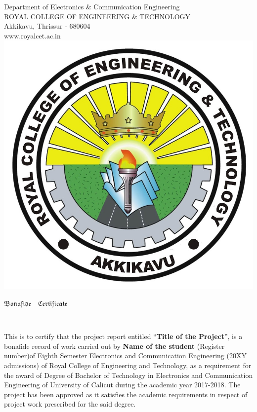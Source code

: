  \thispagestyle{empty}%

\linespread{1}
\vspace*{-1.1cm}
\begin{center}
\Large{Department of Electronics \& Communication
Engineering}\\
\Large{ROYAL COLLEGE OF ENGINEERING \& TECHNOLOGY}\\
\large{Akkikavu, Thrissur - 680604}\\
\large{www.royalcet.ac.in}\\

\includegraphics[scale=0.12]{logo.jpg}\\ [1cm]

\begin{huge}
$ \mathfrak{Bonafide \quad Certificate}$
\end{huge}{}\\[0.5cm]
\end{center}
\justify
\linespread{1.5}
This is to certify that the project report entitled “\textbf{Title of the Project}”, is a bonafide record of work carried out by \textbf{Name of the student} (Register number)of Eighth Semester Electronics and Communication Engineering (20XY admissions) of Royal College of Engineering and Technology, as a
requirement for the award of Degree of Bachelor of Technology in Electronics and Communication Engineering of University of Calicut during the academic year 2017-2018. The project has been approved as it satisfies the academic requirements in respect of project work prescribed for the said degree.
\vspace*{2cm}

